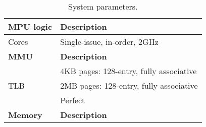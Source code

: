 \begin{table}
	\begin{center}
		\caption{System parameters.}
		\scalebox{0.7}
		\small
		\vspace{0.01in}
		\label{table:system}
		\renewcommand{\arraystretch}{1.0} 
		{\scriptsize
			\begin{tabular}{ l  l }
				\toprule
				{\bf MPU logic}                  & {\bf Description}  \\
				\toprule
				\multirow{1}{*}{Cores}                       &  Single-issue, in-order, 2GHz \\ 
				\toprule
				{\bf MMU}                  & {\bf Description}  \\
				\toprule
				
				
				\multirow{3}{*}{TLB}	& $4$KB pages: 128-entry, fully associative \\
				& $2$MB pages: 128-entry, fully associative \\
				
				\cmidrule{2-2}
				\multirow{1}{*}{MMU Caches} 	&	Perfect \\ 
				
				
				\toprule
				{\bf Memory}                  & {\bf Description}  \\
				\toprule
				

\end{tabular}}
\end{center}
\end{table}

